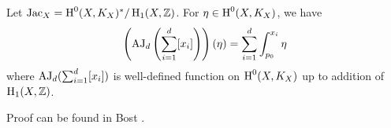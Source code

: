 \begin{theorem}
Let $\operatorname{\mathrm{Jac}}_X = \operatorname{\mathrm{H}}^{0}(X, K_X)^{*} / \operatorname{\mathrm{H}}_1(X, \mathbb{Z})$.
For $\eta \in \operatorname{\mathrm{H}}^{0}(X, K_X)$, we have
\[
    \left(\operatorname{\mathrm{AJ}}_d \left(\sum_{i=1}^{d} [x_i]\right)\right)(\eta) = \sum_{i=1}^{d} \int_{p_0}^{x_i} \eta
\]
where $\operatorname{\mathrm{AJ}}_d(\sum_{i=1}^{d}[x_i])$ is well-defined function on $\operatorname{\mathrm{H}}^{0}(X, K_X)$ up to addition of $\operatorname{\mathrm{H}}_1(X, \mathbb{Z})$.
\end{theorem}
Proof can be found in Bost \cite{bost1992introduction}.
